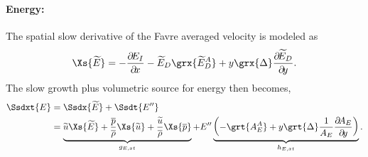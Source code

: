 {\paragraph{Energy:}
The spatial slow derivative of the Favre averaged velocity is modeled as
%
\begin{equation}
\Xs{\fav{E}} =
       - \pp{E_I}{x}
       -\fav{E}_D
          \grx{\fav{E}_D^A}
      + y \grx{\Delta}
             \pp{\fav{E}_D}{y}
.
\end{equation}
%
The slow growth plus volumetric source for energy then becomes,
%
\begin{gather}
\begin{align}
\Ssdxt{E}
 &= \Ssdx{\fav{E}} + \Ssdt{\ffluc{E}}  \\
 &=
\underbrace{%
     \fav{u} \Xs{\fav{E}}
   + \frac{\mean{p}}{\mean{\rho}} \Xs{\fav{u} }
   + \frac{\fav{u} }{\mean{\rho}} \Xs{\mean{p}}
}_{g_{E,xt}}
    + \ffluc{E}
\underbrace{%
       \left(
	 - \grt{A_E^A}
      + y \grt{\Delta}
             \frac{1}{A_{E}} \pp{A_{E}}{y}
         \right)
}_{h_{E,xt}}.
\end{align}
\end{gather}
%

}
